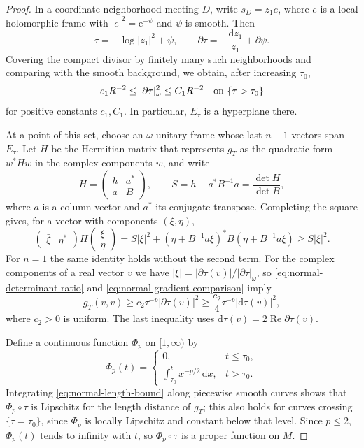 \begin{proof}
In a coordinate neighborhood meeting $D$, write $s_D=z_1 e$, where $e$ is a local holomorphic frame with $|e|^2=\mathrm{e}^{-\psi}$ and $\psi$ is smooth. Then
\[
 \tau=-\log|z_1|^2+\psi,\qquad
 \partial\tau=-\frac{\mathrm{d}z_1}{z_1}+\partial\psi.
\]
Covering the compact divisor by finitely many such neighborhoods and comparing with the smooth background, we obtain, after increasing $\tau_0$,
\begin{equation}\label{eq:normal-gradient-comparison}
 c_1R^{-2}\leq |\partial\tau|_\omega^2\leq C_1R^{-2}
 \quad\hbox{on }\{\tau>\tau_0\}
\end{equation}
for positive constants $c_1,C_1$. In particular, $E_\tau$ is a hyperplane there.

At a point of this set, choose an $\omega$-unitary frame whose last $n-1$ vectors span $E_\tau$. Let $H$ be the Hermitian matrix that represents $g_T$ as the quadratic form $w^*Hw$ in the complex components $w$, and write
\[
 H=\begin{pmatrix}h&a^*\\a&B\end{pmatrix},\qquad
 S=h-a^*B^{-1}a=\frac{\det H}{\det B},
\]
where $a$ is a column vector and $a^*$ its conjugate transpose. Completing the square gives, for a vector with components $(\xi,\eta)$,
\[
 \begin{pmatrix}\bar\xi&\eta^*\end{pmatrix}
 H\begin{pmatrix}\xi\\\eta\end{pmatrix}
 =S|\xi|^2+(\eta+B^{-1}a\xi)^*B(\eta+B^{-1}a\xi)
 \geq S|\xi|^2.
\]
For $n=1$ the same identity holds without the second term. For the complex components of a real vector $v$ we have
$|\xi|=|\partial\tau(v)|/|\partial\tau|_\omega$, so \eqref{eq:normal-determinant-ratio} and \eqref{eq:normal-gradient-comparison} imply
\begin{equation}\label{eq:normal-length-bound}
 g_T(v,v)\geq c_2\tau^{-p}|\partial\tau(v)|^2
 \geq \frac{c_2}{4}\tau^{-p}|\mathrm{d}\tau(v)|^2,
\end{equation}
where $c_2>0$ is uniform. The last inequality uses $\mathrm{d}\tau(v)=2\operatorname{Re}\partial\tau(v)$.

Define a continuous function $\Phi_p$ on $[1,\infty)$ by
\[
 \Phi_p(t)=
 \begin{cases}
  0,&t\leq\tau_0,\\
  \displaystyle\int_{\tau_0}^t x^{-p/2}\,\mathrm{d}x,&t>\tau_0.
 \end{cases}
\]
Integrating \eqref{eq:normal-length-bound} along piecewise smooth curves shows that $\Phi_p\circ\tau$ is Lipschitz for the length distance of $g_T$; this also holds for curves crossing $\{\tau=\tau_0\}$, since $\Phi_p$ is locally Lipschitz and constant below that level. Since $p\leq2$, $\Phi_p(t)$ tends to infinity with $t$, so $\Phi_p\circ\tau$ is a proper function on $M$.


\end{proof}
